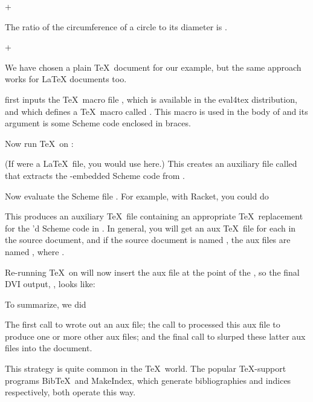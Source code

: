 \p+

The ratio of the circumference of a circle
to its diameter is
.

\bye
+

\n  We have chosen a plain \TeX\ document for
our example, but the same approach works for
LaTeX documents too.

 first inputs the \TeX\ macro
file , which is available in the
eval4tex distribution, and which defines
a \TeX\ macro
called \p{\eval}.  This \p{\eval} macro is used in the body of
 and its argument is some Scheme code
enclosed in braces.

Now run \TeX\ on :


\n (If  were a La\TeX\ file, you would use
 here.) This creates an
auxiliary file called 
that extracts the \p{\eval}-embedded Scheme code from .

Now evaluate the Scheme file .  For example, with
Racket, you could do


\n This produces an auxiliary \TeX\ file 
containing an appropriate \TeX\ replacement for the
\p{\eval}'d Scheme code in .  In general,
you will get an aux \TeX\ file
for each \p{\eval} in
the source document, and if the source document is
named , the aux files are named
, where .

Re-running \TeX\ on  will now insert the
aux file  at the point of
the \p{\eval}, so the final DVI output,
, looks like:

\quote

\endquote

To summarize, we did


\n The first call to  wrote out an aux file; the
call to  processed this aux file to produce
one or more other aux files; and the final call to
 slurped these latter aux files into the
document.

This strategy is quite common in the \TeX\ world.  The
popular \TeX-support programs Bib\TeX\ and
MakeIndex, which generate
bibliographies and indices respectively, both operate
this way.

